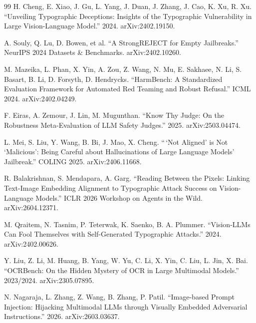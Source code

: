 \documentclass[11pt,a4paper]{article}
\begin{document}
\begin{thebibliography}{99}
 H. Cheng, E. Xiao, J. Gu, L. Yang, J. Duan, J. Zhang, J. Cao, K. Xu, R. Xu. ``Unveiling Typographic Deceptions: Insights of the Typographic Vulnerability in Large Vision-Language Model.'' 2024. arXiv:2402.19150.

 A. Souly, Q. Lu, D. Bowen, et al. ``A StrongREJECT for Empty Jailbreaks.'' NeurIPS 2024 Datasets \& Benchmarks. arXiv:2402.10260.

 M. Mazeika, L. Phan, X. Yin, A. Zou, Z. Wang, N. Mu, E. Sakhaee, N. Li, S. Basart, B. Li, D. Forsyth, D. Hendrycks. ``HarmBench: A Standardized Evaluation Framework for Automated Red Teaming and Robust Refusal.'' ICML 2024. arXiv:2402.04249.

 F. Eiras, A. Zemour, J. Lin, M. Mugunthan. ``Know Thy Judge: On the Robustness Meta-Evaluation of LLM Safety Judges.'' 2025. arXiv:2503.04474.

 L. Mei, S. Liu, Y. Wang, B. Bi, J. Mao, X. Cheng. ``\,`Not Aligned' is Not `Malicious': Being Careful about Hallucinations of Large Language Models' Jailbreak.'' COLING 2025. arXiv:2406.11668.

 R. Balakrishnan, S. Mendapara, A. Garg. ``Reading Between the Pixels: Linking Text-Image Embedding Alignment to Typographic Attack Success on Vision-Language Models.'' ICLR 2026 Workshop on Agents in the Wild. arXiv:2604.12371.

 M. Qraitem, N. Tasnim, P. Teterwak, K. Saenko, B. A. Plummer. ``Vision-LLMs Can Fool Themselves with Self-Generated Typographic Attacks.'' 2024. arXiv:2402.00626.

 Y. Liu, Z. Li, M. Huang, B. Yang, W. Yu, C. Li, X. Yin, C. Liu, L. Jin, X. Bai. ``OCRBench: On the Hidden Mystery of OCR in Large Multimodal Models.'' 2023/2024. arXiv:2305.07895.

 N. Nagaraja, L. Zhang, Z. Wang, B. Zhang, P. Patil. ``Image-based Prompt Injection: Hijacking Multimodal LLMs through Visually Embedded Adversarial Instructions.'' 2026. arXiv:2603.03637.

\end{thebibliography}
\end{document}
